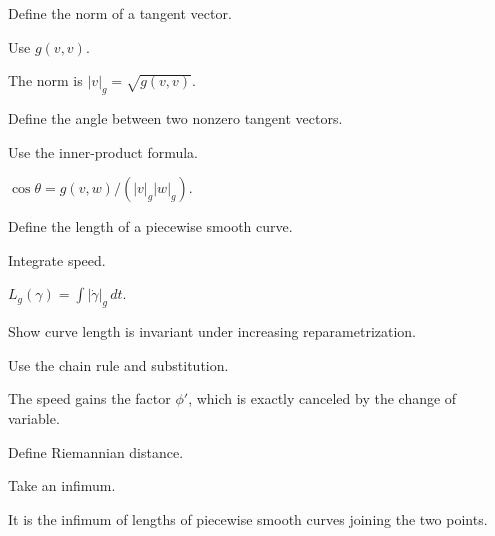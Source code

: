 \begin{exercise}\label{exr:vii20-05}
Define the norm of a tangent vector.
\end{exercise}
\begin{hint}
Use \(g(v,v)\).
\end{hint}
\begin{solution}
The norm is \(|v|_g=\sqrt{g(v,v)}\).
\end{solution}

\begin{exercise}\label{exr:vii20-06}
Define the angle between two nonzero tangent vectors.
\end{exercise}
\begin{hint}
Use the inner-product formula.
\end{hint}
\begin{solution}
\(\cos\theta=g(v,w)/(|v|_g|w|_g)\).
\end{solution}

\begin{exercise}\label{exr:vii20-07}
Define the length of a piecewise smooth curve.
\end{exercise}
\begin{hint}
Integrate speed.
\end{hint}
\begin{solution}
\(L_g(\gamma)=\int|\dot\gamma|_g\,dt\).
\end{solution}

\begin{exercise}\label{exr:vii20-08}
Show curve length is invariant under increasing reparametrization.
\end{exercise}
\begin{hint}
Use the chain rule and substitution.
\end{hint}
\begin{solution}
The speed gains the factor \(\phi'\), which is exactly canceled by the change of variable.
\end{solution}

\begin{exercise}\label{exr:vii20-09}
Define Riemannian distance.
\end{exercise}
\begin{hint}
Take an infimum.
\end{hint}
\begin{solution}
It is the infimum of lengths of piecewise smooth curves joining the two points.
\end{solution}

